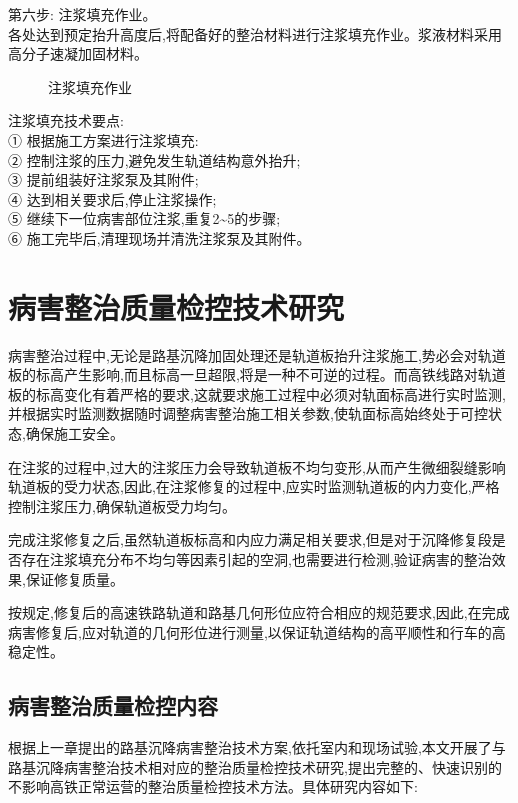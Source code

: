 \documentclass[a4paper,12pt]{ctexrep}
\begin{document}
\noindent 第六步: 注浆填充作业。 \\
各处达到预定抬升高度后,将配备好的整治材料进行注浆填充作业。浆液材料采用高分子速凝加固材料。

\begin{figure}[htbp]
    \centering
    \caption{注浆填充作业}
    \label{fig:2-12}
\end{figure}

\noindent 注浆填充技术要点: \\
① 根据施工方案进行注浆填充: \\
② 控制注浆的压力,避免发生轨道结构意外抬升; \\
③ 提前组装好注浆泵及其附件; \\
④ 达到相关要求后,停止注浆操作; \\
⑤ 继续下一位病害部位注浆,重复2\textasciitilde5的步骤; \\
⑥ 施工完毕后,清理现场并清洗注浆泵及其附件。

\chapter{病害整治质量检控技术研究}

病害整治过程中,无论是路基沉降加固处理还是轨道板抬升注浆施工,势必会对轨道板的标高产生影响,而且标高一旦超限,将是一种不可逆的过程。而高铁线路对轨道板的标高变化有着严格的要求,这就要求施工过程中必须对轨面标高进行实时监测,并根据实时监测数据随时调整病害整治施工相关参数,使轨面标高始终处于可控状态,确保施工安全。

在注浆的过程中,过大的注浆压力会导致轨道板不均匀变形,从而产生微细裂缝影响轨道板的受力状态,因此,在注浆修复的过程中,应实时监测轨道板的内力变化,严格控制注浆压力,确保轨道板受力均匀。

完成注浆修复之后,虽然轨道板标高和内应力满足相关要求,但是对于沉降修复段是否存在注浆填充分布不均匀等因素引起的空洞,也需要进行检测,验证病害的整治效果,保证修复质量。

按规定,修复后的高速铁路轨道和路基几何形位应符合相应的规范要求,因此,在完成病害修复后,应对轨道的几何形位进行测量,以保证轨道结构的高平顺性和行车的高稳定性。

\section{病害整治质量检控内容}

根据上一章提出的路基沉降病害整治技术方案,依托室内和现场试验,本文开展了与路基沉降病害整治技术相对应的整治质量检控技术研究,提出完整的、快速识别的不影响高铁正常运营的整治质量检控技术方法。具体研究内容如下:
\end{document}
